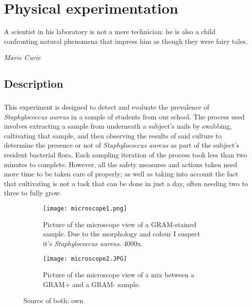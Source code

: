 \chapter{Physical experimentation}
\epigraph{A scientist in his laboratory is not a mere technician: he is also a child confronting natural phenomena that impress him as though they were fairy tales.}{\textit{Marie Curie}}
\section{Description}
\paragraph{}This experiment is designed to detect and evaluate the prevalence of \emph{Staphylococcus aureus} in a sample of students from our school. The process used involves extracting a sample from underneath a subject's nails by swabbing, cultivating that sample, and then observing the results of said culture to determine the presence or not of \emph{Staphylococcus aureus} as part of the subject's resident bacterial flora. Each sampling iteration of the process took less than two minutes to complete. However, all the safety measures and actions taken need more time to be taken care of properly; as well as taking into account the fact that cultivating is not a task that can be done in just a day, often needing two to three to fully grow.
\begin{figure}[H] \centering \begin{subfigure}[b]{0.4\linewidth} \texttt{[image: microscope1.png]} \caption{Picture of the microscope view of a GRAM-stained sample. Due to the morphology and colour I suspect it's \emph{Staphylococcus aureus}. 4000x.} \end{subfigure} \begin{subfigure}[b]{0.4\linewidth} \texttt{[image: microscope2.JPG]} \caption{Picture of the microscope view of a mix between a GRAM+ and a GRAM- sample.} \end{subfigure} \caption{Source of both: own} \end{figure}

